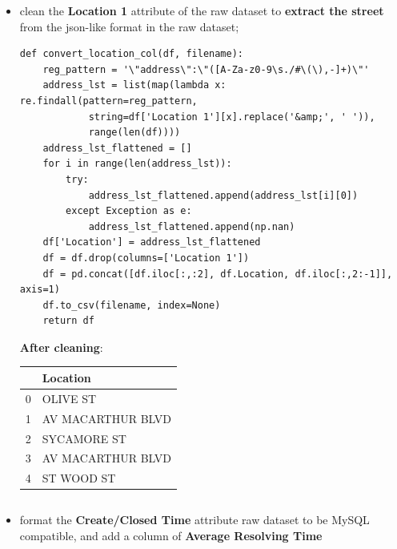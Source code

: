 \documentclass{article} %
\begin{document}
\begin{itemize}
\item clean the \textbf{Location 1} attribute of the raw dataset to\textbf{ extract the street} from the json-like format in the raw dataset;

\lstset{language=python}
\lstset{showstringspaces=false}
\lstset{frame=lines}
\lstset{basicstyle=\footnotesize}
\begin{lstlisting}
def convert_location_col(df, filename):
	reg_pattern = '\"address\":\"([A-Za-z0-9\s./#\(\),-]+)\"'
	address_lst = list(map(lambda x: re.findall(pattern=reg_pattern,
			string=df['Location 1'][x].replace('&amp;', ' ')), 
			range(len(df))))
	address_lst_flattened = []
	for i in range(len(address_lst)):
		try:
			address_lst_flattened.append(address_lst[i][0])
		except Exception as e:
			address_lst_flattened.append(np.nan)
	df['Location'] = address_lst_flattened
	df = df.drop(columns=['Location 1'])
	df = pd.concat([df.iloc[:,:2], df.Location, df.iloc[:,2:-1]], axis=1)
	df.to_csv(filename, index=None)
	return df
\end{lstlisting}

\noindent \textbf{After cleaning}: 
\[\]

\begin{tabular}{|l|l|}
	\toprule
	{} &           Location \\
	\midrule
	0 &           OLIVE ST \\
	1 &  AV MACARTHUR BLVD \\
	2 &        SYCAMORE ST \\
	3 &  AV MACARTHUR BLVD \\
	4 &         ST WOOD ST \\
	\bottomrule
\end{tabular}

\[\]

\item format the \textbf{Create/Closed Time} attribute raw dataset to be MySQL compatible, and add a column of \textbf{Average Resolving Time}


\end{itemize}
\end{document}
